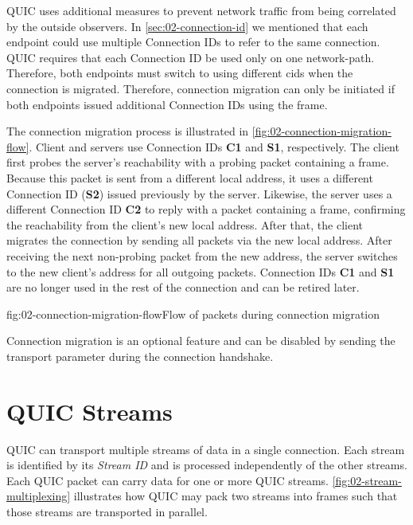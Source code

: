 QUIC uses additional measures to prevent network traffic from being correlated by the outside
observers. In \autoref{sec:02-connection-id} we mentioned that each endpoint could use multiple
Connection IDs to refer to the same connection. QUIC requires that each Connection ID be used only
on one \gls{network-path}. Therefore, both endpoints must switch to using different \glspl{cid} when
the connection is migrated. Therefore, connection migration can only be initiated if both endpoints
issued additional Connection IDs using the \NEWCONNECTIONID{} frame.

The connection migration process is illustrated in \autoref{fig:02-connection-migration-flow}.
Client and servers use Connection IDs \textbf{C1} and \textbf{S1}, respectively. The client first
probes the server's reachability with a probing packet containing a \PATHCHALLENGE{} frame. Because
this packet is sent from a different local address, it uses a different Connection ID (\textbf{S2})
issued previously by the server. Likewise, the server uses a different Connection ID \textbf{C2} to
reply with a packet containing a \PATHRESPONSE{} frame, confirming the reachability from the
client's new local address. After that, the client migrates the connection by sending all packets
via the new local address. After receiving the next non-probing packet from the new address, the
server switches to the new client's address for all outgoing packets. Connection IDs \textbf{C1} and
\textbf{S1} are no longer used in the rest of the connection and can be retired later.

\begin{myFigure}{fig:02-connection-migration-flow}{Flow of packets during connection migration}

\resizebox{\linewidth}{!}{}

\end{myFigure}

Connection migration is an optional feature and can be disabled by sending the
\DisableActiveMigration{} transport parameter during the connection handshake.

\section{QUIC Streams}

QUIC can transport multiple streams of data in a single connection. Each stream is identified by its
\textit{Stream ID} and is processed independently of the other streams. Each QUIC packet can carry
data for one or more QUIC streams. \autoref{fig:02-stream-multiplexing} illustrates how QUIC may
pack two streams into frames such that those streams are transported in parallel.

